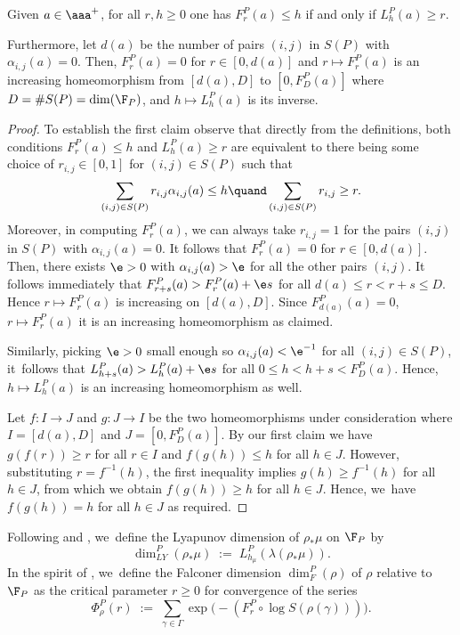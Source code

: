 \begin{lemma}\label{lyapunovvsfalconer}
Given \(a \in \aaa^+\), for all \(r,h \ge 0\) one has \(F_r^P(a) \le h\) if and only if \(L_h^P(a) \ge r\).

Furthermore, let \(d(a)\) be the number of pairs \((i,j) \) in \(S(P)\) with \(\alpha_{i,j}(a) = 0\).
Then, \(F^P_r(a) = 0 \) for \(r \in [0,d(a)]\) and \(r \mapsto F^P_r(a)\) is an increasing homeomorphism from \([d(a),D]\) to \([0,F_{D}^P(a)]\) where \(D = \# S(P)=\dim (\F_P)\), and \(h \mapsto L_h^P(a)\) is its inverse.
\end{lemma}
\begin{proof}
To establish the first claim observe that directly from the definitions, both conditions \(F_r^P(a) \le h\) and \(L_h^P(a) \ge r\) are equivalent to there being some choice of \(r_{i,j} \in [0,1]\) for \((i,j) \in S(P)\) such that
\[
\sum_{(i,j) \in S(P)} r_{i,j}\alpha_{i,j}(a) \le h\quand\sum_{(i,j) \in S(P)} r_{i,j} \ge r.
\]
Moreover, in computing \(F^P_r(a)\), we can always take \(r_{i,j} = 1 \) for the pairs \((i,j) \) in \(S(P)\) with \(\alpha_{i,j}(a) = 0\). It follows that \(F^P_r(a) = 0 \) for \(r \in [0,d(a)]\). Then, there exists \(\e >0\) with \(\alpha_{i,j}(a) > \e\) for all the other pairs \((i,j)\). It follows immediately that \(F^P_{r+s}(a) >F^P_r(a) + \e s\) for all \(d(a) \le r < r+s \le D\). Hence \(r \mapsto F^P_r(a)\) is increasing on \([d(a), D]\). Since \(F_{d(a)}^P(a) = 0\), \(r \mapsto F^P_r(a)\) it is an increasing homeomorphism as claimed.

Similarly, picking \(\e > 0\) small enough so \(\alpha_{i,j}(a) < \e^{-1}\) for all \((i,j) \in S(P)\), it~follows that \(L^P_{h + s}(a) > L^P_h(a) + \e s\) for all \(0 \le h < h+s < F_D^P(a)\). Hence, \(h \mapsto L_h^P(a)\) is an increasing homeomorphism as well.

Let \(f:I \to J\) and \(g:J \to I\) be the two homeomorphisms under consideration where \(I = [d(a),D]\) and \(J = [0,F_D^P(a)]\). By our first claim we have \(g(f(r)) \ge r\) for all \(r \in I\) and \(f(g(h)) \le h\) for all \(h \in J\). However, substituting \(r = f^{-1}(h)\), the first inequality implies \(g(h) \ge f^{-1}(h)\) for all \(h \in J\), from which we obtain \(f(g(h)) \ge h\) for all \(h \in J\). Hence, we~have \(f(g(h)) = h\) for all \(h \in J\) as required.
\end{proof}

Following \cite{DO80} and \cite{KY79}, we~define the Lyapunov dimension of \(\rho_*\mu\) on \(\F_P\) by
\begin{equation}\label{dimlyap:definition}\dim_{LY}^P(\rho_*\mu) \; := \; L_{h_\mu}^P (\lambda(\rho_*\mu)). \end{equation}
In the spirit of \cite{Fal88}, we~define the Falconer dimension \(\dim_F^P(\rho)\) of \(\rho\) relative to~\(\F_P\) as the critical parameter \(r \ge 0\) for convergence of the series
\begin{equation}\label{falconerseries} \Phi_\rho^P (r) \; := \; \sum_{\gamma \in \Gamma} \exp \bigl(-(F_r^P\circ\log S(\rho(\gamma)))\bigr).\end{equation}

